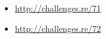 \subsection{\Exercises}

\begin{itemize}
	\item \url{http://challenges.re/71}
	\item \url{http://challenges.re/72}
\end{itemize}


